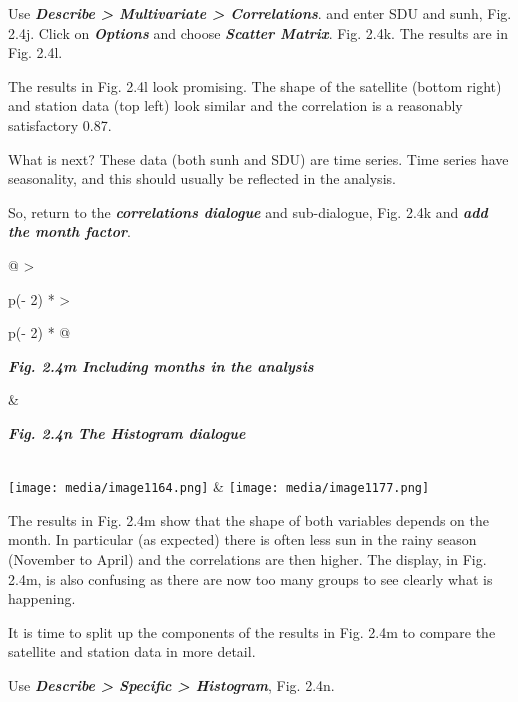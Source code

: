 \documentclass[
  letterpaper,
  DIV=11,
  numbers=noendperiod]{scrreprt}
\begin{document}
Use \textbf{\emph{Describe \textgreater{} Multivariate \textgreater{}
Correlations}}. and enter SDU and sunh, Fig. 2.4j. Click on
\textbf{\emph{Options}} and choose \textbf{\emph{Scatter Matrix}}. Fig.
2.4k. The results are in Fig. 2.4l.

The results in Fig. 2.4l look promising. The shape of the satellite
(bottom right) and station data (top left) look similar and the
correlation is a reasonably satisfactory 0.87.

What is next? These data (both sunh and SDU) are time series. Time
series have seasonality, and this should usually be reflected in the
analysis.

So, return to the \textbf{\emph{correlations dialogue}} and
sub-dialogue, Fig. 2.4k and \textbf{\emph{add the month factor}}.

\begin{longtable}[]{@{}
  >{\raggedright\arraybackslash}p{(\columnwidth - 2\tabcolsep) * }
  >{\raggedright\arraybackslash}p{(\columnwidth - 2\tabcolsep) * }@{}}
\toprule\noalign{}
\begin{minipage}[b]{\linewidth}\raggedright
\textbf{\emph{Fig. 2.4m Including months in the analysis}}
\end{minipage} & \begin{minipage}[b]{\linewidth}\raggedright
\textbf{\emph{Fig. 2.4n The Histogram dialogue}}
\end{minipage} \\
\midrule\noalign{}
\endhead
\bottomrule\noalign{}
\endlastfoot
\texttt{[image: media/image1164.png]}
&
\texttt{[image: media/image1177.png]} \\
\end{longtable}

The results in Fig. 2.4m show that the shape of both variables depends
on the month. In particular (as expected) there is often less sun in the
rainy season (November to April) and the correlations are then higher.
The display, in Fig. 2.4m, is also confusing as there are now too many
groups to see clearly what is happening.

It is time to split up the components of the results in Fig. 2.4m to
compare the satellite and station data in more detail.

Use \textbf{\emph{Describe \textgreater{} Specific \textgreater{}
Histogram}}, Fig. 2.4n.
\end{document}
